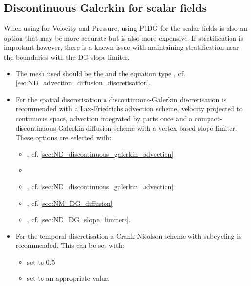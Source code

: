 \subsection{Discontinuous Galerkin for scalar fields}
When using \PoDGPt for Velocity and Pressure, using P1DG for the scalar fields
is also an option that may be more accurate but is also more expensive. If stratification is important however, there is a known
issue with maintaining stratification near the boundaries with the DG slope
limiter.
\begin{itemize}
  \item The mesh used should be the  and the equation type , cf. \ref{sec:ND_advection_diffusion_discretisation}.
  \item For the spatial discretisation a discontinuous-Galerkin discretisation
is recommended with a Lax-Friedrichs advection scheme, velocity
projected to continuous space, advection integrated by parts once and
a compact-discontinuous-Galerkin diffusion scheme with a vertex-based
slope limiter. These options are selected with:
\begin{itemize}
\item{, cf. \ref{sec:ND_discontinuous_galerkin_advection}}
\item{}
\item{, cf. \ref{sec:ND_discontinuous_galerkin_advection}}
\item{, cf. \ref{sec:NM_DG_diffusion}}
\item{, cf. \ref{sec:ND_DG_slope_limiters}.}
\end{itemize}

\item For the temporal discretisation a Crank-Nicolson scheme with subcycling is recommended. This can be set with:
\begin{itemize}
\item{ set to 0.5}
\item{ set to an appropriate value.}
\end{itemize}
\end{itemize}

